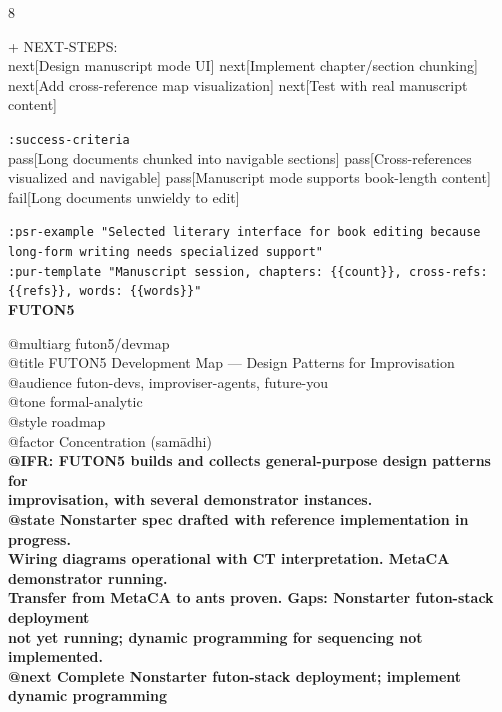 \documentclass[landscape]{article}
\newenvironment{devmapgreenfield}{%
  \def\FrameCommand{\colorbox{devmapgreenfieldbg}}%
  \setlength{\fboxsep}{2pt}%
  \MakeFramed{\advance\hsize-\width \FrameRestore}%
}{\endMakeFramed}
\begin{document}
\begin{paracol}{8}
\begin{devmapgreenfield}
\par
  + NEXT-STEPS:\\
    next[Design manuscript mode UI] next[Implement chapter/section chunking] next[Add cross-reference map visualization] next[Test with real manuscript content]\\
\par
  \texttt{:\allowbreak{}success-\allowbreak{}criteria}\\
    pass[Long documents chunked into navigable sections] pass[Cross-references visualized and navigable] pass[Manuscript mode supports book-length content] fail[Long documents unwieldy to edit]\\
\par
  \texttt{:\allowbreak{}psr-\allowbreak{}example "Selected literary interface for book editing because long-\allowbreak{}form writing needs specialized support"}\\
  \texttt{:\allowbreak{}pur-\allowbreak{}template "Manuscript session,\allowbreak{} chapters:\allowbreak{} \{\{count\}\},\allowbreak{} cross-\allowbreak{}refs:\allowbreak{} \{\{refs\}\},\allowbreak{} words:\allowbreak{} \{\{words\}\}"}\\
\end{devmapgreenfield}
\switchcolumn
\textbf{FUTON5}\par
\medskip
@multiarg futon5/devmap\\
@title FUTON5 Development Map — Design Patterns for Improvisation\\
@audience futon-devs, improviser-agents, future-you\\
@tone formal-analytic\\
@style roadmap\\
@factor Concentration (samādhi)\\
\textbf{@IFR: FUTON5 builds and collects general-purpose design patterns for}\\
\textbf{improvisation, with several demonstrator instances.}\\
\textbf{@state Nonstarter spec drafted with reference implementation in progress.}\\
\textbf{Wiring diagrams operational with CT interpretation. MetaCA demonstrator running.}\\
\textbf{Transfer from MetaCA to ants proven. Gaps: Nonstarter futon-stack deployment}\\
\textbf{not yet running; dynamic programming for sequencing not implemented.}\\
\textbf{@next Complete Nonstarter futon-stack deployment; implement dynamic programming}\\

\end{paracol}
\end{document}
